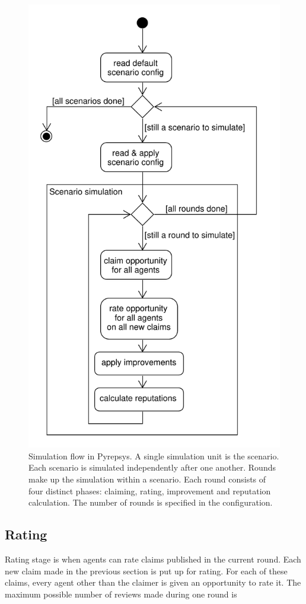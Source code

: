 \documentclass[%
    ]{\PathToTumTemplate/thesis/tum_thesis}
\begin{document}
\begin{figure}[tbp]
  \begin{center}
        \includegraphics[width=0.75\linewidth]	{../uml/simulation_flow.pdf}
    \caption{
    Simulation flow in Pyrepsys.
    A single simulation unit is the \gls{scenario}.
    Each \gls{scenario} is simulated independently after one another.
    Rounds make up the simulation within a \gls{scenario}.
    Each round consists of four distinct phases: claiming, rating, improvement and reputation calculation.
    The number of rounds is specified in the configuration.
    }
    \label{fig:simulation_flow}
  \end{center}
\end{figure}


\subsection{Rating}

Rating stage is when agents can rate claims published in the current round.
Each new claim made in the previous section is put up for rating.
For each of these claims, every agent other than the claimer is given an opportunity to rate it.
The maximum possible number of \glspl{review} made during one round is
\end{document}

